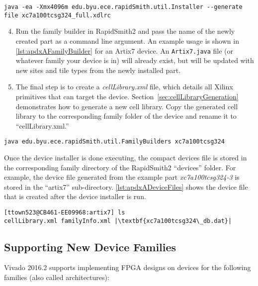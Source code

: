\begin{lstlisting}[numbers=none, caption=RapidSmith2 device installer example
usage, label=lst:apdxAInstaller] 
java -ea -Xmx4096m edu.byu.ece.rapidSmith.util.Installer --generate file xc7a100tcsg324_full.xdlrc
\end{lstlisting}

\begin{enumerate}
\setcounter{enumi}{3}
\item Run the family builder in RapidSmith2 and pass the name of the newly
created part as a command line argument. An example usage is shown in
\autoref{lst:apdxAFamilyBuilder} for an Artix7 device. An \texttt{Artix7.java}
file (or whatever family your device is in) will already exist, but will be
updated with new sites and tile types from the newly installed part.

\item The final step is to create a \textit{cellLibrary.xml} file, which details
all Xilinx primitives that can target the device. Section~\ref{sec:cellLibraryGeneration}
demonstrates how to generate a new cell library. Copy the generated cell library
to the corresponding family folder of the device and rename it to
``cellLibrary.xml.''

\end{enumerate}

\begin{lstlisting}[numbers=none, caption=Family builder example usage,
label=lst:apdxAFamilyBuilder] 
java edu.byu.ece.rapidSmith.util.FamilyBuilders xc7a100tcsg324
\end{lstlisting}

\vspace{.3cm}

\noindent Once the device installer is done executing, the compact devices file
is stored in the corresponding family directory of the RapidSmith2 ``devices''
folder. For example, the device file generated from the example part
\textit{xc7a100tcsg324-3} is stored in the ``artix7'' sub-directory.
\autoref{lst:apdxADeviceFiles} shows the device file that is created
after the device installer is run. 

\begin{lstlisting}[numbers=none, caption=Generated RapidSmith2 device file,
label=lst:apdxADeviceFiles] 
[ttown523@CB461-EE09968:artix7] ls
cellLibrary.xml familyInfo.xml |\textbf{xc7a100tcsg324\_db.dat}| 
\end{lstlisting} 

\subsection{Supporting New Device Families} \label{sec:newFamilies}
Vivado 2016.2 supports implementing FPGA designs on devices for the following
families (also called architectures):

